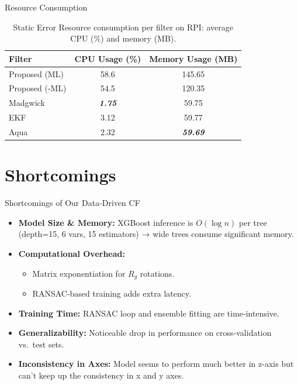 \documentclass[aspectratio=169,xcolor=dvipsnames]{beamer}
\begin{document}
\begin{frame}{Resource Consumption}
\small
\begin{table}[H]
  \centering
  \caption{Static Error Resource consumption per filter on RPI: average CPU (\%) and memory (MB).}
  \label{tab:resource_consumption_static}
  \begin{tabular}{lcc}
    \toprule
    Filter & CPU Usage (\%) & Memory Usage (MB) \\
    \midrule
    Proposed (ML)     & 58.6 & 145.65 \\
    Proposed (-ML)    & 54.5 & 120.35 \\
    Madgwick           & \textbf{\textit{1.75}} & 59.75 \\
    EKF                & 3.12 & 59.77 \\
    Aqua               & 2.32 & \textbf{\textit{59.69}} \\
    \bottomrule
  \end{tabular}
\end{table}
    
\end{frame}


\section{Shortcomings}

\begin{frame}{Shortcomings of Our Data‐Driven CF}
\begin{itemize}
  \item<1-> \textbf{Model Size \& Memory:}
    XGBoost inference is $O(\log n)$ per tree (depth=15, 6 vars, 15 estimators) → wide trees consume significant memory.
  \item<2-> \textbf{Computational Overhead:}
    \begin{itemize}
      \item Matrix exponentiation for $R_g$ rotations.
      \item RANSAC‐based training adds extra latency.
    \end{itemize}
  \item<3-> \textbf{Training Time:}
    RANSAC loop and ensemble fitting are time‐intensive.
  \item<4-> \textbf{Generalizability:}
    Noticeable drop in performance on cross‐validation vs.\ test sets.
  \item<5-> \textbf{Inconsistency in Axes:}
    Model seems to perform much better in z-axis but can't keep up the consistency in x and y axes.
\end{itemize}
\end{frame}
\end{document}
